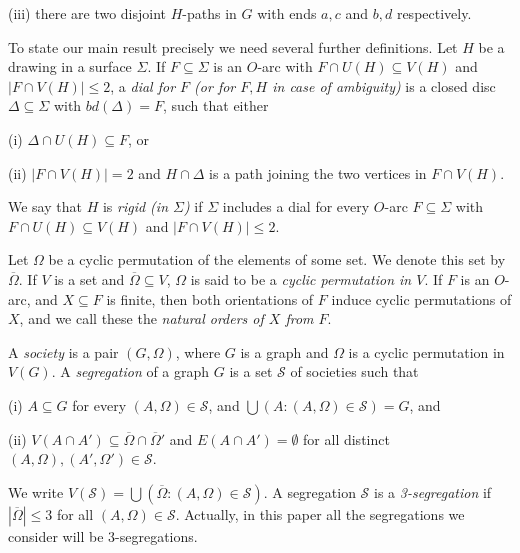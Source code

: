 \hspace*{12pt}(iii) there are two disjoint $H$-paths in $G$ with ends $a, c$ and $b, d$ respectively.


To state our main result precisely we need several further definitions. Let $H$ be a drawing in a surface $\Sigma$. If $F \subseteq \Sigma$ is an $O$-arc with $F \cap U(H) \subseteq V(H)$ and $|F \cap V(H)| \le 2$, a \textit{dial for $F$ (or for $F, H$ in case of ambiguity)} is a closed disc $\Delta \subseteq \Sigma$ with $bd(\Delta) = F$, such that either

\hspace*{12pt}(i) $\Delta \cap U(H) \subseteq F$, or

\hspace*{12pt}(ii) $|F \cap V(H)| = 2$ and $H \cap \Delta$ is a path joining the two vertices in $F \cap V(H)$.

We say that $H$ is \textit{rigid (in $\Sigma$)} if $\Sigma$ includes a dial for every $O$-arc $F \subseteq \Sigma$ with $F \cap U(H) \subseteq V(H)$ and $|F \cap V(H)| \le 2$.

Let $\Omega$ be a cyclic permutation of the elements of some set. We denote this set by $\overline{\Omega}$. If $V$ is a set and $\overline{\Omega} \subseteq V$, $\Omega$ is said to be a \textit{cyclic permutation in $V$}. If $F$ is an $O$-arc, and $X \subseteq F$ is finite, then both orientations of $F$ induce cyclic permutations of $X$, and we call these the \textit{natural orders of $X$ from $F$}.

A \textit{society} is a pair $(G, \Omega)$, where $G$ is a graph and $\Omega$ is a cyclic permutation in $V(G)$. A \textit{segregation} of a graph $G$ is a set $\mathscr{S}$ of societies such that

\hspace*{12pt}(i) $A \subseteq G$ for every $(A, \Omega) \in \mathscr{S}$, and $\bigcup (A \colon (A, \Omega) \in \mathscr{S}) = G$, and

\hspace*{12pt}(ii) $V(A \cap A') \subseteq \overline{\Omega} \cap \overline{\Omega}'$ and $E(A \cap A') = \emptyset$ for all distinct $(A, \Omega), (A', \Omega') \in \mathscr{S}$.

We write $V(\mathscr{S}) = \bigcup (\overline{\Omega} \colon (A, \Omega) \in \mathscr{S})$. A segregation $\mathscr{S}$ is a \textit{3-segregation} if $|\overline{\Omega}| \le 3$ for all $(A, \Omega) \in \mathscr{S}$. Actually, in this paper all the segregations we consider will be 3-segregations.

